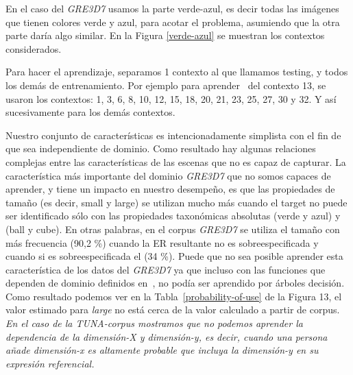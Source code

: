 En el caso del \textit{GRE3D7} usamos la parte verde-azul, es decir todas las im\'agenes que tienen colores verde y azul, para acotar el problema, asumiendo que la otra parte dar\'ia algo similar. En la Figura \ref{verde-azul} se muestran los contextos considerados.

Para hacer el aprendizaje, separamos 1 contexto al que llamamos testing, y todos los dem\'as de entrenamiento. Por ejemplo para aprender \puse\ del contexto 13, se usaron los contextos: 1, 3, 6, 8, 10, 12, 15, 18, 20, 21, 23, 25, 27, 30 y 32. Y as\'i sucesivamente para los dem\'as contextos.

Nuestro conjunto de caracter\'{i}sticas es intencionadamente simplista con el fin de que sea
independiente de dominio. Como resultado hay algunas relaciones complejas
entre las caracter\'{i}sticas de las escenas que no es capaz de
capturar. La caracter\'{i}stica m\'as importante del dominio \textit{GRE3D7}
que no somos capaces de aprender, y tiene un impacto en nuestro desempe\~no, es que
las propiedades de tama\~no (es decir, small y large) se utilizan mucho
m\'as cuando el target no puede ser identificado s\'olo con las propiedades taxon\'omicas absolutas 
(verde y azul) y (ball y cube). En otras palabras, en el corpus \textit{GRE3D7} se utiliza el tama\~no con m\'as frecuencia (90,2 \%)
cuando la ER resultante no es sobreespecificada y cuando si es sobreespecificada el (34 \%). 
Puede que no sea posible aprender esta caracter\'{i}stica de los
datos del \textit{GRE3D7} ya que incluso con las funciones que dependen de dominio definidos
en~\cite[Cap\'{i}tulo 6] {viet:gene11}, no pod\'{i}a ser aprendido por \'arboles decisi\'on. 
Como resultado podemos ver en la Tabla~\ref{probability-of-use} de la Figura 13, el valor estimado para 
\emph{large} no est\'a cerca de la
valor calculado a partir de corpus. \textit{En el caso de la TUNA-corpus
  mostramos que no podemos aprender la dependencia de la dimensi\'on-X y
  dimensi\'on-y, es decir, cuando una persona a\~nade dimensi\'on-x es altamente
  probable que incluya la dimensi\'on-y en su expresi\'on referencial.}


